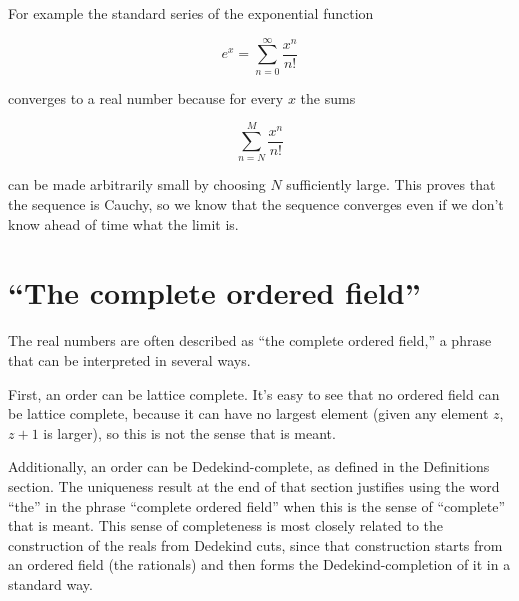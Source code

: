 \documentclass{article}
\begin{document}
For example the standard series of the exponential function
                                                                                
$$
e^x = \sum_{n=0}^\infty \frac{x^n}{n!}
$$
                                                                                
converges to a real number because for every $x$ the sums
                                                                                
                                                                                
$$
\sum_{n=N}^M \frac{x^n}{n!}
$$
                                                                                
can be made arbitrarily small by choosing $N$ sufficiently large. This proves
that the sequence is Cauchy, so we know that the sequence converges even if we
don't know ahead of time what the limit is.
                                                                               
\section{``The complete ordered field''}

The real numbers are often described as ``the complete ordered field,'' a phrase
that can be interpreted in several ways.

First, an order can be lattice complete. It's easy to see that no ordered field
can be lattice complete, because it can have no largest element (given any
element $z$, $z + 1$ is larger), so this is not the sense that is meant.

Additionally, an order can be Dedekind-complete, as defined in the Definitions section. The uniqueness result at the end of that section justifies using the
word ``the'' in the phrase ``complete ordered field'' when this is the sense of
``complete'' that is meant. This sense of completeness is most closely related to the construction of the reals from Dedekind cuts, since that construction
starts from an ordered field (the rationals) and then forms the Dedekind-completion of it in a standard way. 
\end{document}
